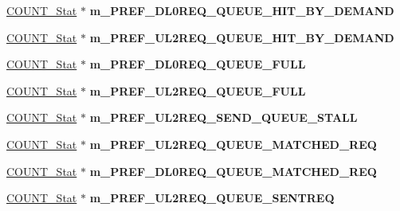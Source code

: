 \begin{DoxyCompactItemize}
\item 
\hypertarget{classall__stats__c_aec8b7d90caff05b4499a621f11cd4ade}{
\hyperlink{classCOUNT__Stat}{COUNT\_\-Stat} $\ast$ {\bfseries m\_\-PREF\_\-DL0REQ\_\-QUEUE\_\-HIT\_\-BY\_\-DEMAND}}
\label{classall__stats__c_aec8b7d90caff05b4499a621f11cd4ade}

\item 
\hypertarget{classall__stats__c_a1c9d667e8c93b561430d3c208f0ea4a2}{
\hyperlink{classCOUNT__Stat}{COUNT\_\-Stat} $\ast$ {\bfseries m\_\-PREF\_\-UL2REQ\_\-QUEUE\_\-HIT\_\-BY\_\-DEMAND}}
\label{classall__stats__c_a1c9d667e8c93b561430d3c208f0ea4a2}

\item 
\hypertarget{classall__stats__c_a15fd25ba5f8c081befb45dd66113c088}{
\hyperlink{classCOUNT__Stat}{COUNT\_\-Stat} $\ast$ {\bfseries m\_\-PREF\_\-DL0REQ\_\-QUEUE\_\-FULL}}
\label{classall__stats__c_a15fd25ba5f8c081befb45dd66113c088}

\item 
\hypertarget{classall__stats__c_a99587e27fab7c593a2b30c8579e3603c}{
\hyperlink{classCOUNT__Stat}{COUNT\_\-Stat} $\ast$ {\bfseries m\_\-PREF\_\-UL2REQ\_\-QUEUE\_\-FULL}}
\label{classall__stats__c_a99587e27fab7c593a2b30c8579e3603c}

\item 
\hypertarget{classall__stats__c_ac9a3c1b359553b550ff11e6c12aa3ce4}{
\hyperlink{classCOUNT__Stat}{COUNT\_\-Stat} $\ast$ {\bfseries m\_\-PREF\_\-UL2REQ\_\-SEND\_\-QUEUE\_\-STALL}}
\label{classall__stats__c_ac9a3c1b359553b550ff11e6c12aa3ce4}

\item 
\hypertarget{classall__stats__c_a926d168642242a7ca49b1e51ed0438a6}{
\hyperlink{classCOUNT__Stat}{COUNT\_\-Stat} $\ast$ {\bfseries m\_\-PREF\_\-UL2REQ\_\-QUEUE\_\-MATCHED\_\-REQ}}
\label{classall__stats__c_a926d168642242a7ca49b1e51ed0438a6}

\item 
\hypertarget{classall__stats__c_a47ef70150c5cb35761edda941f9edaef}{
\hyperlink{classCOUNT__Stat}{COUNT\_\-Stat} $\ast$ {\bfseries m\_\-PREF\_\-DL0REQ\_\-QUEUE\_\-MATCHED\_\-REQ}}
\label{classall__stats__c_a47ef70150c5cb35761edda941f9edaef}

\item 
\hypertarget{classall__stats__c_a8ba6e778f9806fa541b501ea0ab44480}{
\hyperlink{classCOUNT__Stat}{COUNT\_\-Stat} $\ast$ {\bfseries m\_\-PREF\_\-UL2REQ\_\-QUEUE\_\-SENTREQ}}
\label{classall__stats__c_a8ba6e778f9806fa541b501ea0ab44480}


\end{DoxyCompactItemize}
